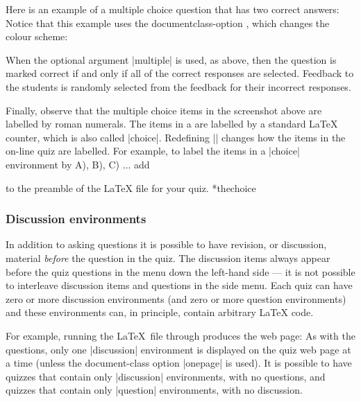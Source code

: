 \documentclass[svgnames]{article}
\makeatletter
\newcommand\macroIndex[1]{%
  \lowercase{\def\temp{#1}}%
  \expandafter\index\expandafter{\temp@\textbackslash#1}%
}
\makeatother
\begin{document}
Here is an example of a multiple choice question that has
two correct answers:
  \label{choice-multiple}
Notice that this example uses the documentclass-option
, which changes the colour scheme:

When the optional argument \LatexCode|multiple| is used, as above, then the
question is marked correct if and only if all of the correct responses
are selected. Feedback to the students is randomly selected from the
feedback for their incorrect responses.

Finally, observe that the multiple choice items in the screenshot above
are labelled by roman numerals. The items in a  are
labelled by a standard \LaTeX{} counter, which is also called
\LatexCode|choice|. Redefining \LatexCode|\thechoice| changes how the
items in the on-line quiz are labelled. For example, to label the items
in a \LatexCode|choice| environment by A), B), C) $\dots$ add
\begin{latexcode}
  \renewcommand\thechoice{\Alph{choice})}
\end{latexcode}
to the preamble of the \LaTeX{} file for your quiz.
*{thechoice}\macroIndex{thechoice}

\subsubsection{Discussion environments}\label{SS:discussion}

In addition to asking questions it is possible to have revision, or
discussion, material \textit{before} the question in the quiz. The
discussion items always appear before the quiz questions in the menu
down the left-hand side --- it is not possible to interleave discussion
items and questions in the side menu. Each quiz can have zero or more
discussion environments (and zero or more question environments) and
these environments can, in principle, contain arbitrary \LaTeX{} code.

For example, running the \LaTeX\ file through \WebQuiz
produces the web page:
As with the questions, only one \LatexCode|discussion| environment is
displayed on the quiz web page at a time (unless the document-class
option \LatexCode|onepage| is used). It is possible to have quizzes
that contain only \LatexCode|discussion| environments, with no questions, and
quizzes that contain only \LatexCode|question| environments, with no
discussion.
\end{document}
